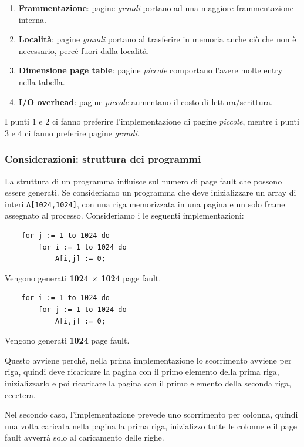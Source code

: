 \documentclass[a4paper,12pt, twoside]{report}
\begin{document}
\begin{enumerate}
    \item \textbf{Frammentazione}: pagine \emph{grandi} portano ad una maggiore frammentazione interna. 
    \item \textbf{Localit\`a}: pagine \emph{grandi} portano al trasferire in memoria anche ci\`o che 
    non \`e necessario, perc\'e fuori dalla localit\`a. 
    \item \textbf{Dimensione page table}: pagine \emph{piccole} comportano l'avere molte entry nella tabella.
    \item \textbf{I/O overhead}: pagine \emph{piccole} aumentano il costo di lettura/scrittura.
\end{enumerate}

I punti $1$ e $2$ ci fanno preferire l'implementazione di pagine \emph{piccole}, mentre i punti $3$ e $4$ ci 
fanno preferire pagine \emph{grandi}.

\subsubsection{Considerazioni: struttura dei programmi}

La struttura di un programma influisce sul numero di page fault che possono essere generati. 
Se consideriamo un programma che deve inizializzare un array di interi \texttt{A[1024,1024]}, con una 
riga memorizzata in una pagina e un solo frame assegnato al processo. Consideriamo i le seguenti
implementazioni:

\begin{lstlisting}
    for j := 1 to 1024 do 
        for i := 1 to 1024 do 
            A[i,j] := 0;
\end{lstlisting}
Vengono generati \textbf{1024 $\times$ 1024} page fault.

\begin{lstlisting}
    for i := 1 to 1024 do 
        for j := 1 to 1024 do 
            A[i,j] := 0;
\end{lstlisting}
Vengono generati \textbf{1024} page fault. 

Questo avviene perch\'e, nella prima implementazione lo scorrimento avviene per riga, 
quindi deve ricaricare la pagina con il primo elemento della prima riga, inizializzarlo 
e poi ricaricare la pagina con il primo elemento della seconda riga, eccetera.

Nel secondo caso, l'implementazione prevede uno scorrimento per colonna, quindi una volta 
caricata nella pagina la prima riga, inizializzo tutte le colonne e il page fault avverr\`a 
solo al caricamento delle righe. 
\end{document}
